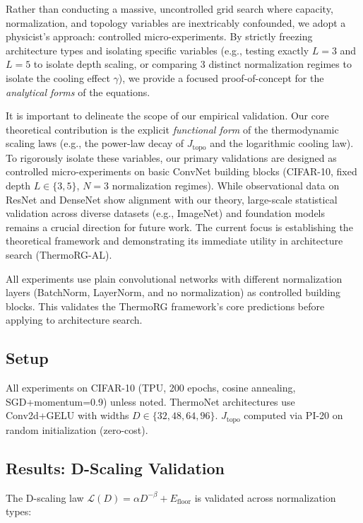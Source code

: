 \documentclass[11pt, a4paper]{article}
\theoremstyle{plain}
\begin{document}
Rather than conducting a massive, uncontrolled grid search where capacity, normalization, and topology variables are inextricably confounded, we adopt a physicist's approach: controlled micro-experiments. By strictly freezing architecture types and isolating specific variables (e.g., testing exactly $L=3$ and $L=5$ to isolate depth scaling, or comparing 3 distinct normalization regimes to isolate the cooling effect $\gamma$), we provide a focused proof-of-concept for the \emph{analytical forms} of the equations.

It is important to delineate the scope of our empirical validation. Our core theoretical contribution is the explicit \emph{functional form} of the thermodynamic scaling laws (e.g., the power-law decay of $J_{\mathrm{topo}}$ and the logarithmic cooling law). To rigorously isolate these variables, our primary validations are designed as controlled micro-experiments on basic ConvNet building blocks (CIFAR-10, fixed depth $L \in \{3,5\}$, $N=3$ normalization regimes). While observational data on ResNet and DenseNet show alignment with our theory, large-scale statistical validation across diverse datasets (e.g., ImageNet) and foundation models remains a crucial direction for future work. The current focus is establishing the theoretical framework and demonstrating its immediate utility in architecture search (ThermoRG-AL).

All experiments use plain convolutional networks with different normalization layers (BatchNorm, LayerNorm, and no normalization) as controlled building blocks. This validates the ThermoRG framework's core predictions before applying to architecture search.

\subsection{Setup}
All experiments on CIFAR-10 (TPU, 200 epochs, cosine annealing, SGD+momentum=0.9) unless noted. ThermoNet architectures use Conv2d+GELU with widths $D \in \{32, 48, 64, 96\}$. $J_{\mathrm{topo}}$ computed via PI-20 on random initialization (zero-cost).

\subsection{Results: D-Scaling Validation}

The D-scaling law $\mathcal{L}(D) = \alpha D^{-\beta} + E_{\mathrm{floor}}$ is validated across normalization types:
\end{document}
